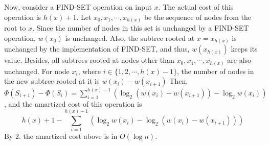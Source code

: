 \documentclass[10pt]{article}
\begin{document}
\begin{enumerate}
		Now, consider a FIND-SET operation on input $x$.
		The actual cost of this operation is $h(x) + 1$.
		Let $x_0, x_1, \cdots, x_{h(x)}$ be the sequence of nodes from the root
		to $x$.
		Since the number of nodes in this set is unchanged by a FIND-SET
		operation, $w(x_0)$ is unchanged.
		Also, the subtree rooted at $x = x_{h(x)}$ is unchanged by the
		implementation of FIND-SET, and thus, $w(x_{h(x)})$ keeps its value.
		Besides, all subtrees rooted at nodes other than $x_0, x_1, \cdots,
		x_{h(x)}$ are also unchanged.
		For node $x_i$, where $i \in \{1, 2, \cdots, h(x)-1\}$, the number of
		nodes in the new subtree rooted at it is $w(x_i) - w(x_{i+1})$
		Then, $\Phi(S_{i+1}) - \Phi(S_i) = \sum_{i=1}^{h(x)-1}(\log_2(w(x_i)
		- w(x_{i+1})) - \log_2w(x_i))$, and the amartized cost of this
		operation is 
		$$h(x)+1 - \sum_{i=1}^{h(x)-1}(\log_2w(x_i) - \log_2(w(x_i) - w(x_{i+1})))$$
		By 2. the amartized cost above is in $O(\log n)$.


\end{enumerate}
\end{document}
